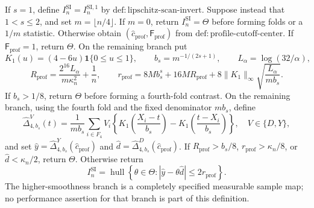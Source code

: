 If \(s=1\), define \(I_n^{\mathrm{SI}}=I_n^{\mathrm{SI},1}\) by
\(\mathrm{def:lipschitz\mbox{-}scan\mbox{-}invert}\).  Suppose instead
that \(1<s\le2\), and set \(m=\lfloor n/4\rfloor\).  If \(m=0\),
return \(I_n^{\mathrm{SI}}=\Theta\) before forming folds or a
\(1/m\) statistic.  Otherwise obtain
\((\widehat c_{\mathrm{prof}},\mathsf F_{\mathrm{prof}})\) from
\(\mathrm{def:profile\mbox{-}cutoff\mbox{-}center}\).  If
\(\mathsf F_{\mathrm{prof}}=1\), return \(\Theta\).  On the remaining
branch put
\[
 K_1(u)=(4-6u)\mathbf 1\{0\le u\le1\},\qquad
 b_s=m^{-1/(2s+1)},\qquad L_\alpha=\log(32/\alpha),
\]
\[
 R_{\mathrm{prof}}
 =\frac{2^{16}L_\alpha}{m\kappa_n^2}+\frac1n,
 \qquad
 r_{\mathrm{prof}}
 =8Mb_s^s+16MR_{\mathrm{prof}}
  +8\|K_1\|_\infty
     \sqrt{\frac{L_\alpha}{mb_s}}.
\]
If \(b_s>1/8\), return \(\Theta\) before forming a fourth-fold
contrast.  On the remaining branch, using the fourth fold and the
fixed denominator \(mb_s\), define
\[
 \widehat\Delta_{4,b_s}^{V}(t)
 =\frac1{mb_s}\sum_{i\in F_4}V_i
 \left\{K_1\!\left(\frac{X_i-t}{b_s}\right)
       -K_1\!\left(\frac{t-X_i}{b_s}\right)\right\},
 \quad V\in\{D,Y\},
\]
and set \(\widehat y=\widehat\Delta_{4,b_s}^{Y}
(\widehat c_{\mathrm{prof}})\) and
\(\widehat d=\widehat\Delta_{4,b_s}^{D}
(\widehat c_{\mathrm{prof}})\).  If
\(R_{\mathrm{prof}}>b_s/8\), \(r_{\mathrm{prof}}>\kappa_n/8\), or
\(\widehat d<\kappa_n/2\), return \(\Theta\).  Otherwise return
\[
 I_n^{\mathrm{SI}}
 =\operatorname{hull}\left\{\theta\in\Theta:
 |\widehat y-\theta\widehat d|\le2r_{\mathrm{prof}}\right\}.
\]
The higher-smoothness branch is a completely specified measurable
sample map; no performance assertion for that branch is part of this
definition.

